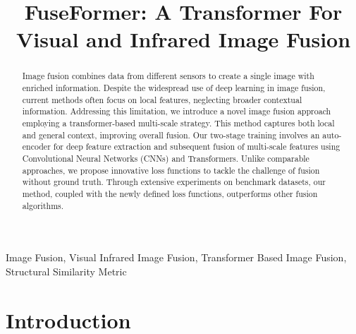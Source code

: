 \documentclass[conference]{IEEEtran}
\begin{document}
\title{FuseFormer: A Transformer For Visual and Infrared Image Fusion\\
}

\author{
\and
{}
}

\maketitle

\begin{abstract}
    Image fusion combines data from different sensors to create a single image with enriched information. Despite the widespread use of deep learning in image fusion, current methods often focus on local features, neglecting broader contextual information. Addressing this limitation, we introduce a novel image fusion approach employing a transformer-based multi-scale strategy. This method captures both local and general context, improving overall fusion. Our two-stage training involves an auto-encoder for deep feature extraction and subsequent fusion of multi-scale features using Convolutional Neural Networks (CNNs) and Transformers. Unlike comparable approaches, we propose innovative loss functions to tackle the challenge of fusion without ground truth. Through extensive experiments on benchmark datasets, our method, coupled with the newly defined loss functions, outperforms other fusion algorithms.
\end{abstract}

\begin{IEEEkeywords}
Image Fusion, Visual Infrared Image Fusion, Transformer Based Image Fusion, Structural Similarity Metric
\end{IEEEkeywords}


\section{Introduction}

\end{document}
